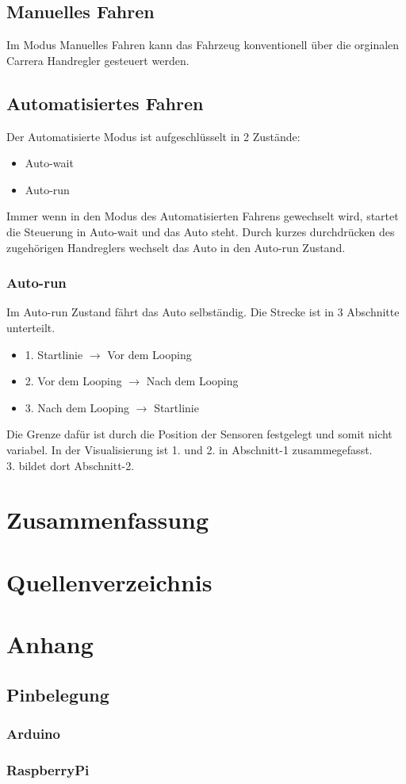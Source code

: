\documentclass[a4paper, 11pt]{scrartcl}
\begin{document}
	\subsection{Manuelles Fahren}
		Im Modus Manuelles Fahren kann das Fahrzeug konventionell über die orginalen Carrera Handregler gesteuert
		werden.
	\subsection{Automatisiertes Fahren}
		Der Automatisierte Modus ist aufgeschlüsselt in 2 Zustände:
		\begin{itemize}
			\item Auto-wait
			\item Auto-run
		\end{itemize}
		Immer wenn in den Modus des Automatisierten Fahrens gewechselt wird, startet die Steuerung in
		Auto-wait und das Auto steht.
		Durch kurzes durchdrücken des zugehörigen Handreglers wechselt das Auto in den Auto-run Zustand.
		\subsubsection{Auto-run}
			Im Auto-run Zustand fährt das Auto selbständig. Die Strecke ist in 3 Abschnitte unterteilt.
			\begin{itemize}
				\item{1.} Startlinie $\rightarrow$ Vor dem Looping
				\item{2.} Vor dem Looping $\rightarrow$ Nach dem Looping
				\item{3.} Nach dem Looping $\rightarrow$ Startlinie
			\end{itemize}
			Die Grenze dafür ist durch die Position der Sensoren festgelegt und somit nicht variabel.
			In der Visualisierung ist 1. und 2. in Abschnitt-1 zusammegefasst. \\3. bildet dort Abschnitt-2.
			\newpage

\newpage

\section{Zusammenfassung}
\newpage

\section{Quellenverzeichnis}
\newpage

\section{Anhang}
\subsection{Pinbelegung}
\subsubsection{Arduino}
\subsubsection{RaspberryPi}
\end{document}
